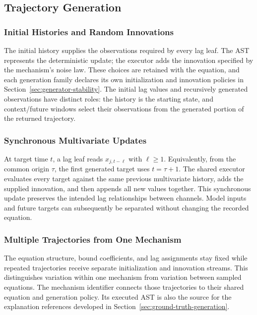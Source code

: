\subsection{Trajectory Generation}
\label{sec:generator-trajectories}

\subsubsection{Initial Histories and Random Innovations}
The initial history supplies the observations required by every lag leaf.
The AST represents the deterministic update; the executor adds the
innovation specified by the mechanism's noise law. These choices are retained
with the equation, and each generation family declares its own initialization
and innovation policies in Section~\ref{sec:generator-stability}.
The initial lag values and recursively generated observations have distinct
roles: the history is the starting state, and context/future windows select
their observations from the generated portion of the returned trajectory.

\subsubsection{Synchronous Multivariate Updates}
At target time $t$, a lag leaf reads $x_{j,t-\ell}$ with $\ell\geq1$.
Equivalently, from the common origin $\tau$, the first generated target uses
$t=\tau+1$. The shared executor
 evaluates every target against the
same previous multivariate history, adds the supplied innovation, and then
appends all new values together. This synchronous update preserves the
intended lag relationships between channels. Model inputs and future targets
can subsequently be separated without changing the recorded equation.

\subsubsection{Multiple Trajectories from One Mechanism}
The equation structure, bound coefficients, and lag assignments stay fixed
while repeated trajectories receive separate initialization and innovation
streams. This distinguishes variation within one mechanism from variation
between sampled equations. The mechanism identifier connects those
trajectories to their shared equation and generation policy. Its executed
AST is also the source for the explanation references developed in
Section~\ref{sec:ground-truth-generation}.
